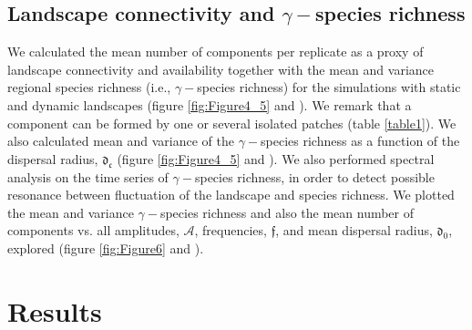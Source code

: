 \documentclass[a4paper,12pt]{article}
\begin{document}
\subsection*{Landscape connectivity and $\gamma-$species richness}

We calculated the mean number of components per replicate as a proxy of landscape connectivity and availability together with the mean and variance regional species richness (i.e., $\gamma-$species richness) for the simulations with static and dynamic landscapes (figure \ref{fig:Figure4_5} and ). We remark that a component can be formed by one or several isolated patches (table \ref{table1}). We also calculated mean and variance of the $\gamma-$species richness as a function of the dispersal radius, $\mathfrak{d_{c}}$ (figure \ref{fig:Figure4_5} and ). We also performed spectral analysis on the time series of $\gamma-$species richness, in order to detect possible resonance between fluctuation of the landscape and species richness. We plotted the mean and variance $\gamma-$species richness and also the mean number of components vs. all amplitudes, $\mathcal{A}$, frequencies, $\mathfrak{f}$, and mean dispersal radius, $\mathfrak{d_{0}}$, explored (figure \ref{fig:Figure6} and ). 
    
\section*{Results}
\end{document}
